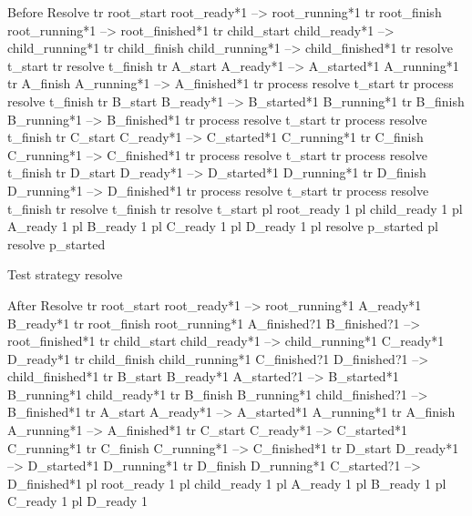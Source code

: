 Before Resolve
tr root_start root_ready*1  --> root_running*1 
tr root_finish root_running*1  --> root_finished*1 
tr child_start child_ready*1  --> child_running*1 
tr child_finish child_running*1  --> child_finished*1 
tr resolve t_start
tr resolve t_finish
tr A_start A_ready*1  --> A_started*1 A_running*1 
tr A_finish A_running*1  --> A_finished*1 
tr process resolve t_start
tr process resolve t_finish
tr B_start B_ready*1  --> B_started*1 B_running*1 
tr B_finish B_running*1  --> B_finished*1 
tr process resolve t_start
tr process resolve t_finish
tr C_start C_ready*1  --> C_started*1 C_running*1 
tr C_finish C_running*1  --> C_finished*1 
tr process resolve t_start
tr process resolve t_finish
tr D_start D_ready*1  --> D_started*1 D_running*1 
tr D_finish D_running*1  --> D_finished*1 
tr process resolve t_start
tr process resolve t_finish
tr resolve t_finish
tr resolve t_start
pl root_ready 1
pl child_ready 1
pl A_ready 1
pl B_ready 1
pl C_ready 1
pl D_ready 1
pl resolve p_started
pl resolve p_started

Test strategy resolve

After Resolve
tr root_start root_ready*1  --> root_running*1 A_ready*1 B_ready*1 
tr root_finish root_running*1 A_finished?1 B_finished?1  --> root_finished*1 
tr child_start child_ready*1  --> child_running*1 C_ready*1 D_ready*1 
tr child_finish child_running*1 C_finished?1 D_finished?1  --> child_finished*1 
tr B_start B_ready*1 A_started?1  --> B_started*1 B_running*1 child_ready*1 
tr B_finish B_running*1 child_finished?1  --> B_finished*1 
tr A_start A_ready*1  --> A_started*1 A_running*1 
tr A_finish A_running*1  --> A_finished*1 
tr C_start C_ready*1  --> C_started*1 C_running*1 
tr C_finish C_running*1  --> C_finished*1 
tr D_start D_ready*1  --> D_started*1 D_running*1 
tr D_finish D_running*1 C_started?1  --> D_finished*1 
pl root_ready 1
pl child_ready 1
pl A_ready 1
pl B_ready 1
pl C_ready 1
pl D_ready 1
